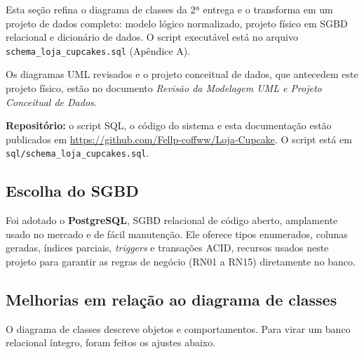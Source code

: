 \documentclass[12pt]{article}
\begin{document}
Esta seção refina o diagrama de classes da 2ª entrega e o transforma em um projeto de dados completo: modelo lógico normalizado, projeto físico em SGBD relacional e dicionário de dados. O script executável está no arquivo \texttt{schema\_loja\_cupcakes.sql} (Apêndice A).

Os diagramas UML revisados e o projeto conceitual de dados, que antecedem este projeto físico, estão no documento \textit{Revisão da Modelagem UML e Projeto Conceitual de Dados}.

\textbf{Repositório:} o script SQL, o código do sistema e esta documentação estão publicados em \url{https://github.com/Fellp-coffww/Loja-Cupcake}. O script está em \texttt{sql/schema\_loja\_cupcakes.sql}.

\subsection{Escolha do SGBD}

Foi adotado o \textbf{PostgreSQL}, SGBD relacional de código aberto, amplamente usado no mercado e de fácil manutenção. Ele oferece tipos enumerados, colunas geradas, índices parciais, \textit{triggers} e transações ACID, recursos usados neste projeto para garantir as regras de negócio (RN01 a RN15) diretamente no banco.

\subsection{Melhorias em relação ao diagrama de classes}

O diagrama de classes descreve objetos e comportamentos. Para virar um banco relacional íntegro, foram feitos os ajustes abaixo.
\end{document}
